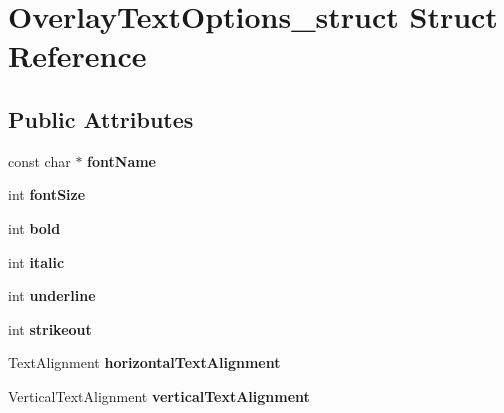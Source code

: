 \hypertarget{structOverlayTextOptions__struct}{
\section{OverlayTextOptions\_\-struct Struct Reference}
\label{structOverlayTextOptions__struct}
}
\subsection*{Public Attributes}
\begin{DoxyCompactItemize}
\item 
\hypertarget{structOverlayTextOptions__struct_a9d6dcf3ecce67215fe575bb2c1c87fb8}{
const char $\ast$ {\bfseries fontName}}
\label{structOverlayTextOptions__struct_a9d6dcf3ecce67215fe575bb2c1c87fb8}

\item 
\hypertarget{structOverlayTextOptions__struct_ac006ac14a3ccda0bc9308cc4fe3dac6e}{
int {\bfseries fontSize}}
\label{structOverlayTextOptions__struct_ac006ac14a3ccda0bc9308cc4fe3dac6e}

\item 
\hypertarget{structOverlayTextOptions__struct_a79ec1f43d79b5c5940dc1cf4da40ec39}{
int {\bfseries bold}}
\label{structOverlayTextOptions__struct_a79ec1f43d79b5c5940dc1cf4da40ec39}

\item 
\hypertarget{structOverlayTextOptions__struct_abeb3b152dc8ee07513d8c72da48965e4}{
int {\bfseries italic}}
\label{structOverlayTextOptions__struct_abeb3b152dc8ee07513d8c72da48965e4}

\item 
\hypertarget{structOverlayTextOptions__struct_a03e72a14dcd3aafa7d9c8daa51c1c268}{
int {\bfseries underline}}
\label{structOverlayTextOptions__struct_a03e72a14dcd3aafa7d9c8daa51c1c268}

\item 
\hypertarget{structOverlayTextOptions__struct_a4249a3bd88817aea2c4156c8dc2b5210}{
int {\bfseries strikeout}}
\label{structOverlayTextOptions__struct_a4249a3bd88817aea2c4156c8dc2b5210}

\item 
\hypertarget{structOverlayTextOptions__struct_ab08fbf662761fd8786db48a6e8504444}{
TextAlignment {\bfseries horizontalTextAlignment}}
\label{structOverlayTextOptions__struct_ab08fbf662761fd8786db48a6e8504444}

\item 
\hypertarget{structOverlayTextOptions__struct_a45721719ea07085a51911630eb2f50dd}{
VerticalTextAlignment {\bfseries verticalTextAlignment}}
\label{structOverlayTextOptions__struct_a45721719ea07085a51911630eb2f50dd}


\end{DoxyCompactItemize}
